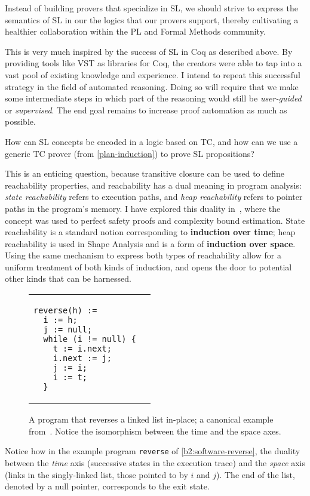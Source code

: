 \begin{proposal}
Instead of building provers that specialize in SL, we should strive to express the semantics of SL in our the logics that our provers support, thereby cultivating a healthier collaboration within the PL and Formal Methods community.
\end{proposal}

This is very much inspired by the success of SL in Coq as described above.
By providing tools like VST as libraries for Coq, the creators were able to tap into a vast pool of existing knowledge and experience.
I intend to repeat this successful strategy in the field of automated reasoning.
Doing so will require that we make some intermediate steps in which part of the reasoning would still be
\emph{user-guided} or \emph{supervised}.
The end goal remains to increase proof automation as much as possible.

\begin{researchquestion}
How can SL concepts be encoded in a logic based on TC,
and how can we use a generic TC prover (from \autoref{plan-induction})
to prove SL propositions?
\end{researchquestion}

This is an enticing question, because transitive closure can be used to define reachability properties,
and reachability has a dual meaning in program analysis: \emph{state reachability} refers to execution paths,
and \emph{heap reachability} refers to pointer paths in the program's memory.
I have explored this duality in~\cite{ESOP2021:Ish-Shalom},
where the concept was used to perfect safety proofs and complexity bound estimation.
State reachability is a standard notion corresponding to \textbf{induction over time};
heap reachability is used in Shape Analysis and is a form of \textbf{induction over space}.
Using the same mechanism to express both types of reachability allow for a uniform treatment of both kinds of induction, and opens the door to potential other kinds that can be harnessed.

\begin{figure}
\centering
\begin{tabular}{ll}
\begin{lstlisting}[basicstyle=\linespread{1.36}\ttfamily\fontsize{10pt}{8pt}\selectfont]
reverse(h) :=
  i := h;
  j := null;
  while (i != null) {
    t := i.next;
    i.next := j;
    j := i;
    i := t;
  }
\end{lstlisting}
&

\end{tabular}
\caption{A program that reverses a linked list in-place;
 a canonical example from~\cite{CAV2002:Reynolds}.
 Notice the isomorphism between the time and the space axes.
 }
\label{b2:software-reverse}
\end{figure}

Notice how in the example program \texttt{reverse}
of \autoref{b2:software-reverse},
the duality between the \emph{time} axis (successive states in the execution trace) and the \emph{space}
axis (links in the singly-linked list, \esp those pointed to by $i$ and $j$).
The end of the list, denoted by a null pointer,
corresponds to the exit state.
